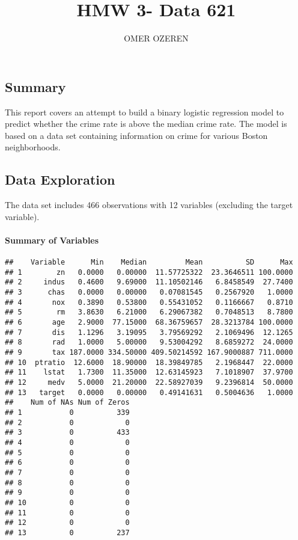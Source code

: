 \documentclass[]{article}
\title{HMW 3- Data 621}
\author{OMER OZEREN}
\date{}
\let\oldparagraph\paragraph
\renewcommand{\paragraph}[1]{\oldparagraph{#1}\mbox{}}
\begin{document}
\maketitle

{
\setcounter{tocdepth}{5}
\tableofcontents
}
\hypertarget{summary}{%
\subsection{Summary}\label{summary}}

This report covers an attempt to build a binary logistic regression
model to predict whether the crime rate is above the median crime rate.
The model is based on a data set containing information on crime for
various Boston neighborhoods.

\hypertarget{data-exploration}{%
\subsection{Data Exploration}\label{data-exploration}}

The data set includes 466 observations with 12 variables (excluding the
target variable).

\hypertarget{summary-of-variables}{%
\paragraph{Summary of Variables}\label{summary-of-variables}}

\begin{verbatim}
##    Variable      Min    Median         Mean          SD      Max
## 1        zn   0.0000   0.00000  11.57725322  23.3646511 100.0000
## 2     indus   0.4600   9.69000  11.10502146   6.8458549  27.7400
## 3      chas   0.0000   0.00000   0.07081545   0.2567920   1.0000
## 4       nox   0.3890   0.53800   0.55431052   0.1166667   0.8710
## 5        rm   3.8630   6.21000   6.29067382   0.7048513   8.7800
## 6       age   2.9000  77.15000  68.36759657  28.3213784 100.0000
## 7       dis   1.1296   3.19095   3.79569292   2.1069496  12.1265
## 8       rad   1.0000   5.00000   9.53004292   8.6859272  24.0000
## 9       tax 187.0000 334.50000 409.50214592 167.9000887 711.0000
## 10  ptratio  12.6000  18.90000  18.39849785   2.1968447  22.0000
## 11    lstat   1.7300  11.35000  12.63145923   7.1018907  37.9700
## 12     medv   5.0000  21.20000  22.58927039   9.2396814  50.0000
## 13   target   0.0000   0.00000   0.49141631   0.5004636   1.0000
##    Num of NAs Num of Zeros
## 1           0          339
## 2           0            0
## 3           0          433
## 4           0            0
## 5           0            0
## 6           0            0
## 7           0            0
## 8           0            0
## 9           0            0
## 10          0            0
## 11          0            0
## 12          0            0
## 13          0          237
\end{verbatim}
\end{document}
